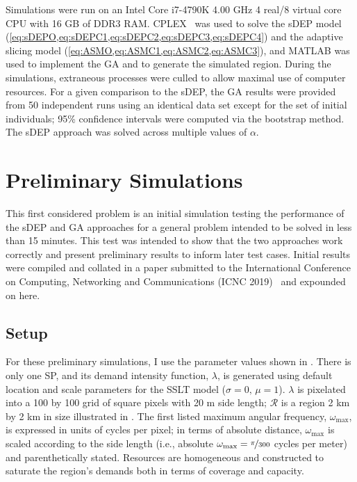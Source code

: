 \documentclass[12pt,dvipsnames]{report}
\begin{document}
Simulations were run on an Intel Core i7-4790K 4.00 GHz 4 real/8 virtual core CPU with 16 GB of DDR3 RAM.  CPLEX~\cite{Cplex} was used to solve the sDEP model (\cref{eq:sDEPO,eq:sDEPC1,eq:sDEPC2,eq:sDEPC3,eq:sDEPC4}) and the adaptive slicing model (\cref{eq:ASMO,eq:ASMC1,eq:ASMC2,eq:ASMC3}), and MATLAB was used to implement the GA and to generate the simulated region.  During the simulations, extraneous processes were culled to allow maximal use of computer resources.  For a given comparison to the sDEP, the GA results were provided from 50 independent runs using an identical data set except for the set of initial individuals; 95\% confidence intervals were computed via the bootstrap method.  The sDEP approach was solved across multiple values of $\alpha$.

\section{Preliminary Simulations} \label{sec:prelim}

This first considered problem is an initial simulation testing the performance of the sDEP and GA approaches for a general problem intended to be solved in less than 15 minutes.  This test was intended to show that the two approaches work correctly and present preliminary results to inform later test cases.  Initial results were compiled and collated in a paper submitted to the International Conference on Computing, Networking and Communications (ICNC 2019)~\cite{KTeague:BSSelection} and expounded on here.

\subsection{Setup} \label{subsec:prelim_setup}

For these preliminary simulations, I use the parameter values shown in .  There is only one SP, and its demand intensity function, $\lambda$, is generated using default location and scale parameters for the SSLT model ($\sigma = 0,\, \mu = 1$).  $\lambda$ is pixelated into a 100 by 100 grid of square pixels with 20 m side length; $\mathcal{R}$ is a region 2 km by 2 km in size illustrated in .  The first listed maximum angular frequency, $\omega_{\max}$, is expressed in units of cycles per pixel; in terms of absolute distance, $\omega_{\max}$ is scaled according to the side length (i.e., absolute $\omega_{\max} = \nicefrac{\pi}{300}$ cycles per meter) and parenthetically stated.  Resources are homogeneous and constructed to saturate the region's demands both in terms of coverage and capacity.
\end{document}
